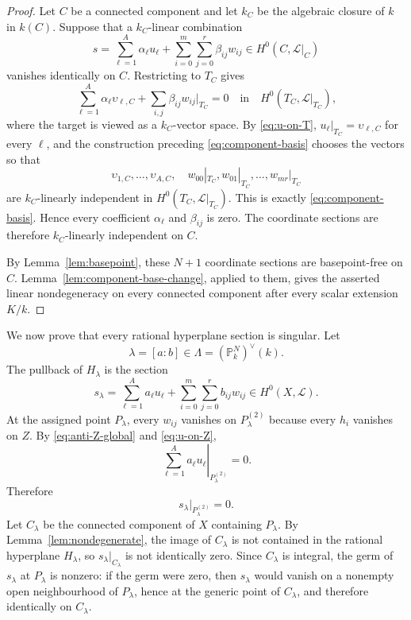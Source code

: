 \documentclass{lms}
\newcommand{\PP}{\mathbb P}
\newcommand{\LL}{\mathcal L}
\begin{document}
\begin{proof}
Let $C$ be a connected component and let $k_C$ be the algebraic closure of $k$ in $k(C)$.  Suppose that a $k_C$-linear combination
\[
        s=\sum_{\ell=1}^{A}\alpha_\ell u_\ell+
        \sum_{i=0}^{m}\sum_{j=0}^{r}\beta_{ij}w_{ij}
        \in H^0(C,\LL|_C)
\]
vanishes identically on $C$.  Restricting to $T_C$ gives
\[
        \sum_{\ell=1}^{A}\alpha_\ell \upsilon_{\ell,C}
        +\sum_{i,j}\beta_{ij}w_{ij}|_{T_C}=0
        \quad\text{in}\quad H^0(T_C,\LL|_{T_C}),
\]
where the target is viewed as a $k_C$-vector space.  By \eqref{eq:u-on-T}, $u_\ell|_{T_C}=\upsilon_{\ell,C}$ for every $\ell$, and the construction preceding \eqref{eq:component-basis} chooses the vectors so that
\[
        \upsilon_{1,C},\ldots,\upsilon_{A,C},
        \quad
        w_{00}|_{T_C},w_{01}|_{T_C},\ldots,w_{mr}|_{T_C}
\]
are $k_C$-linearly independent in $H^0(T_C,\LL|_{T_C})$.  This is exactly \eqref{eq:component-basis}.  Hence every coefficient $\alpha_\ell$ and $\beta_{ij}$ is zero.  The coordinate sections are therefore $k_C$-linearly independent on $C$.

By Lemma~\ref{lem:basepoint}, these $N+1$ coordinate sections are basepoint-free on $C$.  Lemma~\ref{lem:component-base-change}, applied to them, gives the asserted linear nondegeneracy on every connected component after every scalar extension $K/k$.
\end{proof}

We now prove that every rational hyperplane section is singular.  Let
\[
        \lambda=[a:b]\in\Lambda=(\PP^N_k)^\vee(k).
\]
The pullback of $H_\lambda$ is the section
\[
        s_\lambda=
        \sum_{\ell=1}^{A}a_\ell u_\ell+
        \sum_{i=0}^{m}\sum_{j=0}^{r}b_{ij}w_{ij}
        \in H^0(X,\LL).
\]
At the assigned point $P_\lambda$, every $w_{ij}$ vanishes on $P_\lambda^{(2)}$ because every $h_i$ vanishes on $Z$.  By \eqref{eq:anti-Z-global} and \eqref{eq:u-on-Z},
\[
        \left.\sum_{\ell=1}^{A}a_\ell u_\ell\right|_{P_\lambda^{(2)}}=0.
\]
Therefore
\begin{equation}\label{eq:singular-jet}
        s_\lambda|_{P_\lambda^{(2)}}=0.
\end{equation}
Let $C_\lambda$ be the connected component of $X$ containing $P_\lambda$.  By Lemma~\ref{lem:nondegenerate}, the image of $C_\lambda$ is not contained in the rational hyperplane $H_\lambda$, so $s_\lambda|_{C_\lambda}$ is not identically zero.  Since $C_\lambda$ is integral, the germ of $s_\lambda$ at $P_\lambda$ is nonzero: if the germ were zero, then $s_\lambda$ would vanish on a nonempty open neighbourhood of $P_\lambda$, hence at the generic point of $C_\lambda$, and therefore identically on $C_\lambda$.
\end{document}
